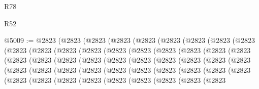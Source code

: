 \begin{lexlean}{R78}
\begin{lexlean}{R52}
\begin{coremodule}
{{{{{{{{{{{{{{{{{{{{{{{{{{{{{{{{{{{{{{{{{{{{{{{{{{{{{{{{{{{{{{{{{{{{{{{{{{{{{{{{{{{{{{{{{{{{{{{{{{{{{{{{{{{{{{{{{{{{{{{{{{{{{{{{{{{{{{{{{{{{{{{{{{{{{{{{{{{{{{{{{{{{{{{{{{{{{{{{{{{{{{{{{{{{{{{{{{{{{{@5009 := @2823
    (@2823
      (@2823
        (@2823
          (@2823
            (@2823
              (@2823
                (@2823
                  (@2823
                    (@2823
                      (@2823
                        (@2823
                          (@2823
                            (@2823
                              (@2823
                                (@2823
                                  (@2823
                                    (@2823
                                      (@2823
                                        (@2823
                                          (@2823
                                            (@2823
                                              (@2823
                                                (@2823
                                                  (@2823
                                                    (@2823
                                                      (@2823
                                                        (@2823
                                                          (@2823
                                                            (@2823
                                                              (@2823
                                                                (@2823
                                                                  (@2823
                                                                    (@2823
                                                                      (@2823
                                                                        (@2823
                                                                          (@2823
                                                                            (@2823
                                                                              (@2823
                                                                                (@2823
                                                                                  (@2823
                                                                                    (@2823
                                                                                      (@2823
                                                                                        (@2823
                                                                                          (@2823
                                                                                            (@2823
                                                                                              (@2823
                                                                                                (@2823
}}}}}}}}}}}}}}}}}}}}}}}}}}}}}}}}}}}}}}}}}}}}}}}}}}}}}}}}}}}}}}}}}}}}}}}}}}}}}}}}}}}}}}}}}}}}}}}}}}}}}}}}}}}}}}}}}}}}}}}}}}}}}}}}}}}}}}}}}}}}}}}}}}}}}}}}}}}}}}}}}}}}}}}}}}}}}}}}}}}}}}}}}}}}}}}}}}}}}}
\end{coremodule}
\end{lexlean}
\end{lexlean}
